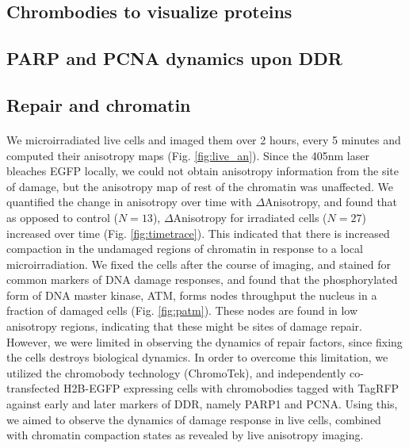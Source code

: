 \subsection{Chrombodies to visualize proteins}
\subsection{PARP and PCNA dynamics upon DDR}
\subsection{Repair and chromatin}
\paragraph*{} We microirradiated live cells and imaged them over 2 hours, every 5 minutes and computed their anisotropy maps (Fig. \ref{fig:live_an}). Since the 405nm laser bleaches EGFP locally, we could not obtain anisotropy information from the site of damage, but the anisotropy map of rest of the chromatin was unaffected. We quantified the change in anisotropy over time with $\Delta$Anisotropy, and found that as opposed to control (\(N=13\)), $\Delta$Anisotropy for irradiated cells (\(N=27\)) increased over time (Fig. \ref{fig:timetrace}). This indicated that there is increased compaction in the undamaged regions of chromatin in response to a local microirradiation. We fixed the cells after the course of imaging, and stained for common markers of DNA damage responses, and found that the phosphorylated form of DNA master kinase, ATM, forms nodes throughput the nucleus in a fraction of damaged cells (Fig. \ref{fig:patm}). These nodes are found in low anisotropy regions, indicating that these might be sites of damage repair. However, we were limited in observing the dynamics of repair factors, since fixing the cells destroys biological dynamics. In order to overcome this limitation, we utilized the chromobody technology (ChromoTek), and independently co-transfected H2B-EGFP expressing cells with chromobodies tagged with TagRFP against early and later markers of DDR, namely PARP1 and PCNA. Using this, we aimed to observe the dynamics of damage response in live cells, combined with chromatin compaction states as revealed by live anisotropy imaging.

